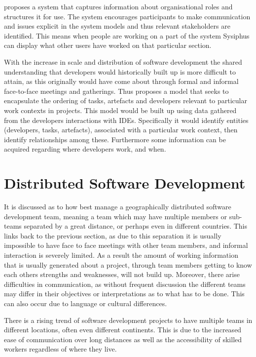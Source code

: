 \documentclass{l4proj}
\begin{document}
\citet{bruegge06sysiphus} proposes a system that captures information about organisational roles and structures it for use.  The system encourages participants to make communication and issues explicit in the system models and thus relevant stakeholders are identified.  This means when people are working on a part of the system Sysiphus can display what other users have worked on that particular section.

With the increase in scale and distribution of software development the shared understanding that developers would historically built up is more difficult to attain, as this originally would have come about through formal and informal face-to-face meetings and gatherings.  Thus \citet{omoronyia09developer} proposes a model that seeks to encapsulate the ordering of tasks, artefacts and developers relevant to particular work contexts in projects.  This model would be built up using data gathered from the developers interactions with IDEs.  Specifically it would identify entities (developers, tasks, artefacts), associated with a particular work context, then identify relationships among these. Furthermore some information can be acquired regarding where developers work, and when.


\section {Distributed Software Development}

It is discussed as to how best manage a geographically distributed software development team, meaning a team which may have multiple members or sub-teams separated by a great distance, or perhaps even in different countries.  This links back to the previous section, as due to this separation it is usually impossible to have face to face meetings with other team members, and informal interaction is severely limited.   As a result the amount of working information that is usually generated about a project, through team members getting to know each others strengths and weaknesses, will not build up.  Moreover, there arise difficulties in communication, as without frequent discussion the different teams may differ in their objectives or interpretations as to what has to be done.  This can also occur due to language or cultural differences.


There is a rising trend of software development projects to have multiple teams in different locations, often even different continents.  This is due to the increased ease of communication over long distances as well as the accessibility of skilled workers regardless of where they live.
\end{document}
